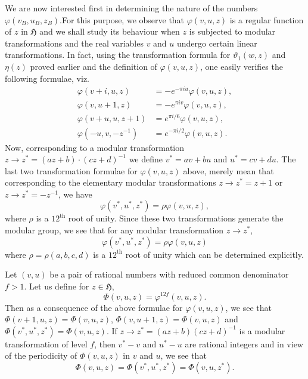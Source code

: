 We are now interested first in determining the nature of the numbers
$\varphi(v_{B},u_{B},z_{B})$.\pageoriginale For this purpose, we
observe that $\varphi(v,u,z)$ is a regular function of $z$ in
$\mathfrak{H}$ and we shall study its behaviour when $z$ is subjected
to modular transformations and the real variables $v$ and $u$ undergo
certain linear transformations. In fact, using the transformation
formula for $\vartheta_{1}(w,z)$ and $\eta(z)$ proved earlier and the
definition of $\varphi(v,u,z)$, one easily verifies the following
formulae, viz.
\begin{equation*}
\begin{split}
\varphi(v+i,u,z) &= -e^{-\pi iu}\varphi(v,u,z),\\
\varphi(v,u+1,z) &= -e^{\pi iv}\varphi(v,u,z),\\
\varphi(v+u,u,z+1) &= e^{\pi i/6}\varphi(v,u,z),\\
\varphi(-u,v,-z^{-1}) &= e^{-\pi i/2}\varphi(v,u,z).
\end{split}\tag{98}\label{98}
\end{equation*}
Now, corresponding to a modular transformation $z\to
z^{\ast}=(az+b)\cdot (cz+d)^{-1}$ we define $v^{\ast}=av+bu$ and
$u^{\ast}=cv+du$. The last two transformation formulae for
$\varphi(v,u,z)$ above, merely mean that corresponding to the
elementary modular transformations $z\to z^{\ast}=z+1$ or $z\to
z^{\ast}=-z^{-1}$, we have
$$
\varphi(v^{\ast},u^{\ast},z^{\ast})=\rho\varphi(v,u,z),
$$
where $\rho$ is a $12^{\text{th}}$ root of unity. Since these two
transformations generate the modular group, we see that for any
modular transformation $z\to z^{\ast}$,
\begin{equation*}
\varphi(v^{\ast},u^{\ast},z^{\ast})=\rho\varphi(v,u,z)\tag*{$(98)'$}
\end{equation*}
where $\rho=\rho(a,b,c,d)$ is a $12^{\text{th}}$ root of unity which
can be determined explicitly.

Let $(v,u)$ be a pair of rational numbers with reduced common
denominator $f>1$. Let us define for $z\in\mathfrak{H}$,
$$
\Phi(v,u,z)=\varphi^{12f}(v,u,z).
$$
Then as a consequence of the above formulae for $\varphi(v,u,z)$, we
see that $\Phi(v+1,u,z)=\Phi(v,u,z)$, $\Phi(v,u+1,z)=\Phi(v,u,z)$ and
$\Phi(v^{\ast},u^{\ast},z^{\ast})=\Phi(v,u,z)$. If $z\to
z^{\ast}=(az+b)(cz+d)^{-1}$ is a modular transformation of level $f$,
then $v^{\ast}-v$ and $u^{\ast}-u$ are rational integers and in view
of the periodicity of $\Phi(v,u,z)$ in $v$ and $u$, we see that
$$
\Phi(v,u,z)=\Phi(v^{\ast},u^{\ast},z^{\ast})=\Phi(v,u,z^{\ast}).
$$\pageoriginale

